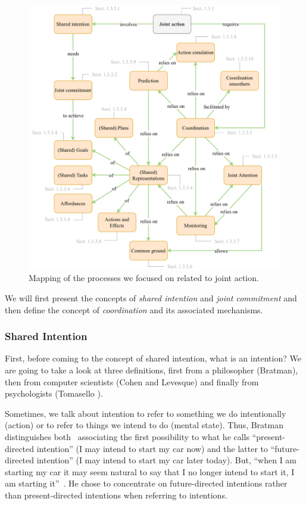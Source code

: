 \documentclass[a4paper,11pt,twoside]{StyleThese}
\begin{document}
\begin{figure}[!htb]
	\includegraphics[width=\linewidth]{figures/chapter1/joint_action.pdf}
	\caption{Mapping of the processes we focused on related to joint action.}
	\label{chap1:fig:ja}
\end{figure}

We will first present the concepts of \emph{shared intention} and \emph{joint commitment} and then define the concept of \emph{coordination} and its associated mechanisms. 

\subsubsection{Shared Intention}
First, before coming to the concept of shared intention, what is an intention? We are going to take a look at three definitions, first from a philosopher (Bratman), then from computer scientists (Cohen and Levesque) and finally from psychologists (Tomasello \etal). 

Sometimes, we talk about intention to refer to something we do intentionally (action) or to refer to things we intend to do (mental state). Thus, Bratman distinguishes both~\cite{bratman_1984_two} associating the first possibility to what he calls ``present-directed intention'' (I may intend to start my car now) and the latter to ``future-directed intention'' (I may intend to start my car later today). But, ``when I am starting my car it may seem natural to say that I no longer intend to start it, I am starting it''~\cite[p.~379]{bratman_1984_two}. He chose to concentrate on future-directed intentions rather than present-directed intentions when referring to intentions. 
\end{document}
